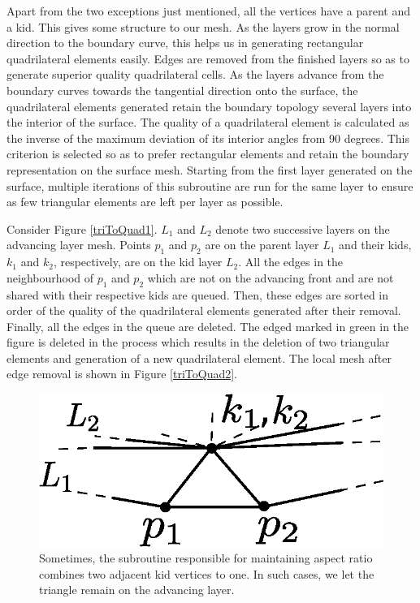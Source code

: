Apart from the two exceptions just mentioned, all the vertices have a parent and a kid. This gives some structure to our mesh. As the layers grow in the normal direction to the boundary curve, this helps us in generating rectangular quadrilateral elements easily. Edges are removed from the finished layers so as to generate superior quality quadrilateral cells. As the layers advance from the boundary curves towards the tangential direction onto the surface, the quadrilateral elements generated retain the boundary topology several layers into the interior of the surface. The quality of a quadrilateral element is calculated as the inverse of the maximum deviation of its interior angles from 90 degrees. This criterion is selected so as to prefer rectangular elements and retain the boundary representation on the surface mesh. Starting from the first layer generated on the surface, multiple iterations of this subroutine are run for the same layer to ensure as few triangular elements are left per layer as possible.

Consider Figure \ref{triToQuad1}. $L_1$ and $L_2$ denote two successive layers on the advancing layer mesh. Points $p_1$ and $p_2$ are on the parent layer $L_1$ and their kids, $k_1$ and $k_2$, respectively, are on the kid layer $L_2$. All the edges in the neighbourhood of $p_1$ and $p_2$ which are not on the advancing front and are not shared with their respective kids are queued. Then, these edges are sorted in order of the quality of the quadrilateral elements generated after their removal. Finally, all the edges in the queue are deleted. The edged marked in green in the figure is deleted in the process which results in the deletion of two triangular elements and generation of a new quadrilateral element. The local mesh after edge removal is shown in Figure \ref{triToQuad2}.

\vspace{10pt}
\begin{figure}[hbt!]
  \centering
  \includegraphics[width=0.5\linewidth]{img/m2/combineTriToQuad3.eps}
  \caption[Exception in combining tris to quads]{Sometimes, the subroutine responsible for maintaining aspect ratio combines two adjacent kid vertices to one. In such cases, we let the triangle remain on the advancing layer.}
  \label{triLeft}
\end{figure}

